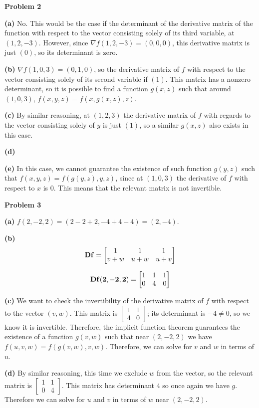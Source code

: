 \documentclass[11pt]{amsart}
\newcommand{\problem}[1]{\bigskip\noindent\textbf{Problem #1}}
\newcommand{\ppart}[1]{\bigskip\textbf{(#1)}}
\begin{document}
\problem{2}

\ppart{a}
No. This would be the case if the determinant of the derivative matrix of the function with respect to the vector consisting solely of its third variable, at $(1, 2, -3)$. However, since $\nabla f(1, 2, -3) = (0, 0, 0)$, this derivative matrix is just $(0)$, so its determinant is zero.

\ppart{b}
$\nabla f(1, 0, 3) = (0, 1, 0)$, so the derivative matrix of $f$ with respect to the vector consisting solely of its second variable if $(1)$. This matrix has a nonzero determinant, so it is possible to find a function $g(x, z)$ such that around $(1, 0, 3)$, $f(x, y, z) = f(x, g(x, z), z)$.

\ppart{c}
By similar reasoning, at $(1, 2, 3)$ the derivative matrix of $f$ with regards to the vector consisting solely of $y$ is just $(1)$, so a similar $g(x, z)$ also exists in this case.

\ppart{d}


\ppart{e}
In this case, we cannot guarantee the existence of such function $g(y, z)$ such that $f(x, y, z) = f(g(y, z), y, z)$, since at $(1, 0, 3)$ the derivative of $f$ with respect to $x$ is $0$. This means that the relevant matrix is not invertible.

\problem{3}

\ppart{a}
$f(2, -2, 2) = (2 - 2 + 2, -4 + 4 - 4) = (2, -4)$.

\ppart{b}
$$
\bf{D}f =
\begin{bmatrix}
	1 & 1 & 1 \\
	v + w & u + w & u + v
\end{bmatrix}
$$

$$
\bf{D}f(2, -2, 2) =
\begin{bmatrix}
	1 & 1 & 1 \\
	0 & 4 & 0
\end{bmatrix}
$$

\ppart{c}
We want to check the invertibility of the derivative matrix of $f$ with respect to the vector $(v, w)$. This matrix is $\begin{bmatrix}1 & 1 \\4 & 0\end{bmatrix}$; its determinant is $-4 \neq 0$, so we know it is invertible. Therefore, the implicit function theorem guarantees the existence of a function $g(v, w)$ such that near $(2, -2, 2)$ we have $f(u, v, w) = f(g(v, w), v, w)$. Therefore, we can solve for $v$ and $w$ in terms of $u$.

\ppart{d}
By similar reasoning, this time we exclude $w$ from the vector, so the relevant matrix is $\begin{bmatrix}1 & 1 \\0 & 4\end{bmatrix}$. This matrix has determinant $4$ so once again we have $g$. Therefore we can solve for $u$ and $v$ in terms of $w$ near $(2, -2, 2)$.
\end{document}
